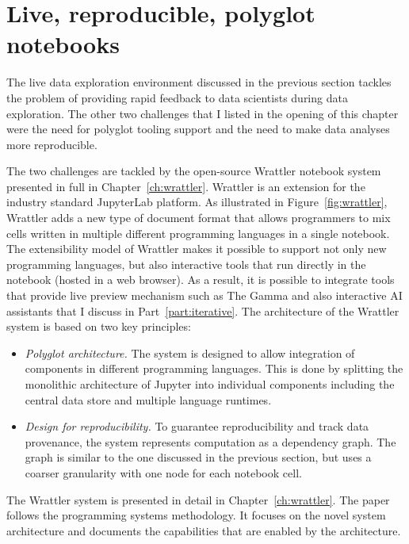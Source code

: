\documentclass[fleqn,11pt]{report}
\theoremstyle{definition}
\begin{document}
\section{Live, reproducible, polyglot notebooks}

The live data exploration environment discussed in the previous section tackles the problem of
providing rapid feedback to data scientists during data exploration. The other two challenges that
I listed in the opening of this chapter were the need for polyglot tooling support and the need
to make data analyses more reproducible.

The two challenges are tackled by the open-source Wrattler notebook system presented in full in
Chapter~\ref{ch:wrattler}. Wrattler is an extension for the industry standard JupyterLab platform.
As illustrated in Figure~\ref{fig:wrattler}, Wrattler adds a new type of document format that
allows programmers to mix cells written in multiple different programming languages in a single
notebook. The extensibility model of Wrattler makes it possible to support not only new programming
languages, but also interactive tools that run directly in the notebook (hosted in a web browser).
As a result, it is possible to integrate tools that provide live preview mechanism such as
The Gamma and also interactive AI assistants that I discuss in Part~\ref{part:iterative}.
The architecture of the Wrattler system is based on two key principles:

\begin{itemize}
\item \emph{Polyglot architecture.} The system is designed to allow integration of components in
  different programming languages. This is done by splitting the monolithic architecture of
  Jupyter into individual components including the central data store and multiple language runtimes.

\item \emph{Design for reproducibility.} To guarantee reproducibility and track data provenance,
  the system represents computation as a dependency graph. The graph is similar to the one discussed
  in the previous section, but uses a coarser granularity with one node for each notebook cell.
\end{itemize}

The Wrattler system is presented in detail in Chapter~\ref{ch:wrattler}. The paper follows the
programming systems methodology. It focuses on the novel system architecture and documents the
capabilities that are enabled by the architecture.
\end{document}

